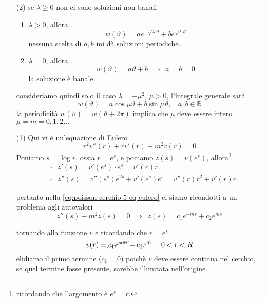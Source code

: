 \documentclass[10pt,a4paper,twoside,openright]{book}
\begin{document}
\begin{dimostrazione}
\begin{enumerate}
\item [(2)] se $\lambda \geqslant 0$ non ci sono soluzioni non banali
\begin{enumerate}
\item $\lambda  >0$, allora\begin{equation*}
w(\vartheta) =ae^{-\sqrt{\lambda } \vartheta } +be^{\sqrt{\lambda } \vartheta }
\end{equation*}nessuna scelta di $a,b$ mi dà soluzioni periodiche.
\item $\lambda =0$, allora\begin{equation*}
w(\vartheta) =a\vartheta +b\ \ \Rightarrow \ \ a=b=0
\end{equation*}la soluzione è banale.
\end{enumerate}

consideriamo quindi solo il caso $\lambda =-\mu ^{2}$, $\mu  >0$, l'integrale generale sarà\begin{equation*}
w(\vartheta) =a\cos \mu \vartheta +b\sin \mu \vartheta,\ \ \ \ a,b\in \mathbb{R}
\end{equation*}la periodicità $w(\vartheta )=w(\vartheta +2\pi )$ implica che $\mu $ deve essere intero $\mu =m=0,1,2\dotsc $
\item [(1)] Qui vi è un'equazione di Eulero
\begin{equation}
r^{2} v''(r) +rv'(r) -m^{2} v(r) =0
\label{eq:poisson-cerchio-5-eq-eulero}
\end{equation}
Poniamo $s=\log r$, ossia $r=e^{s}$, e poniamo $z(s) =v\left(e^{s}\right)$, allora\footnote{ricordando che l'argomento è $e^{s} =r$.}\begin{equation*}
\begin{array}{ l }
\Rightarrow \ \ z'(s) =v'\left(e^{s}\right) \cdotp e^{s} =v'(r) r\\
\Rightarrow \ \ z''(s) =v''\left(e^{s}\right) e^{2s} +v'\left(e^{s}\right) e^{s} =v''(r) r^{2} +v'(r) r
\end{array}
\end{equation*}

pertanto nella \eqref{eq:poisson-cerchio-5-eq-eulero} ci siamo ricondotti a un problema agli autovalori\begin{equation*}
z''(s) -m^{2} z(s) =0\ \ \Rightarrow \ \ z(s) =c_{1} e^{-ms} +c_{2} e^{ms}
\end{equation*}

tornando alla funzione $v$ e ricordando che $r=e^{s}$\begin{equation*}
v(r) =\cancel{c_{1} r^{-m}} +c_{2} r^{m} \ \ \ \ 0< r< R
\end{equation*}elidiamo il primo termine ($c_{1}=0$) poichè $v$ deve essere continua nel cerchio, se quel termine fosse presente, sarebbe illimitata nell'origine.
\end{enumerate}


\end{dimostrazione}
\end{document}
